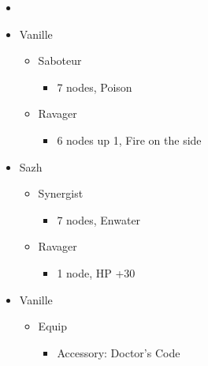 \begin{menu}
\begin{itemize}
    \paradigm
    \begin{itemize}
        \item {}%
{\paradigmline{\rav}{\com}{}}%
{\paradigmline[2]{\textit{\sab}}{\textit{\syn}}{}}%
{\paradigmline{(\sab)}{\syn}{}}%
{\paradigmline{\rav}{\rav}{}}%
{\paradigmline{[\sab]}{(\rav)}{}}%
{\paradigmline{[\sab]}{\com}{}}
    \end{itemize}
    \crystarium
    \begin{itemize}
        \item Vanille
        \begin{itemize}
            \item Saboteur
            \begin{itemize}
                \item 7 nodes, Poison
            \end{itemize}
            \item Ravager
            \begin{itemize}
                \item 6 nodes up 1, Fire on the side
            \end{itemize}
        \end{itemize}
        \item Sazh
        \begin{itemize}
            \item Synergist
            \begin{itemize}
                \item 7 nodes, Enwater
            \end{itemize}
            \item Ravager
            \begin{itemize}
                \item 1 node, HP +30
            \end{itemize}
        \end{itemize}
    \end{itemize}
    \equip
    \begin{itemize}
        \item Vanille
        \begin{itemize}
            \item Equip
            \begin{itemize}
                \item Accessory: Doctor's Code

\end{itemize}
\end{itemize}
\end{itemize}
\end{itemize}
\end{menu}
